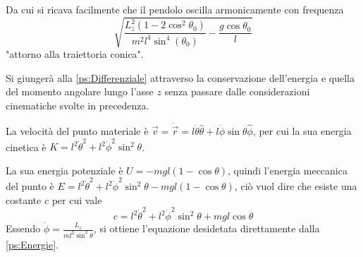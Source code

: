 \documentclass[../main.tex]{subfiles}
\begin{document}
Da cui si ricava facilmente che il pendolo oscilla armonicamente con frequenza $$\sqrt{\frac{L_z^2(1-2\cos^2\theta_0)}{m^2l^4\sin^4(\theta_0)}-\frac{g\cos\theta_0}{l}}$$ "attorno alla traiettoria conica".

\solution[2]
Si giunger\`a alla \cref{ps:Differenziale} attraverso la conservazione dell'energia e quella del momento angolare lungo l'asse $z$ senza passare dalle considerazioni cinematiche svolte in precedenza.

La velocit\`a del punto materiale \`e $\vec{v}=\dot{\vec{r}}=l\dot{\theta}\hat{\theta}+l\dot{\phi}\sin\theta\hat{\phi}$, per cui la sua energia cinetica \`e $K=l^2\dot{\theta}^2+l^2\dot{\phi}^2\sin^2\theta$.

La sua energia potenziale \`e $U=-mgl(1-\cos\theta)$, quindi l'energia meccanica del punto \`e $E=l^2\dot{\theta}^2+l^2\dot{\phi}^2\sin^2\theta-mgl(1-\cos\theta)$, ci\`o vuol dire che esiste una costante $c$ per cui vale
\begin{equation}\label{ps:Energie}
c=l^2\dot{\theta}^2+l^2\dot{\phi}^2\sin^2\theta+mgl\cos\theta
\end{equation}
Essendo $\displaystyle \dot{\phi}=\frac{L_z}{ml^2\sin^2\theta}$, si ottiene l'equazione desidetata direttamente dalla \cref{ps:Energie}. 
\end{document}
